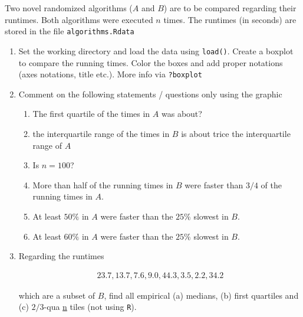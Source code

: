 
\begin{exercise}

Two novel randomized algorithms ($A$ and $B$) are to be compared regarding their runtimes.
Both algorithms were executed $n$ times.
The runtimes (in seconds) are stored in the file \texttt{algorithms.Rdata}

\begin{enumerate}[label = (\alph*)]

    \item Set the working directory and load the data using \texttt{load()}.
    Create a boxplot to compare the running times.
    Color the boxes and add proper notations (axes notations, title etc.).
    More info via \texttt{?boxplot}

    \item Comment on the following statements / questions only using the graphic
    
    \begin{enumerate}[label = (\alph*)]
        \item The first quartile of the times in $A$ was about?
        \item the interquartile range of the times in $B$ is about trice the interquartile range of $A$
        \item Is $n = 100$?
        \item More than half of the running times in $B$ were faster than $3/4$ of the running times in $A$.
        \item At least $50 \%$ in $A$ were faster than the $25 \%$ slowest in $B$.
        \item At least $60 \%$ in $A$ were faster than the $25 \%$ slowest in $B$.
    \end{enumerate}

    \item Regarding the runtimes
    
    \begin{align*}
        23.7, 13.7, 7.6, 9.0, 44.3, 3.5, 2.2, 34.2
    \end{align*}

    which are a subset of $B$, find all empirical (a) medians, (b) first quartiles and (c) $2/3$-qua \underline n tiles (not using \texttt R).

\end{enumerate}

\end{exercise}


\begin{solution}

\phantom{}

\end{solution}

